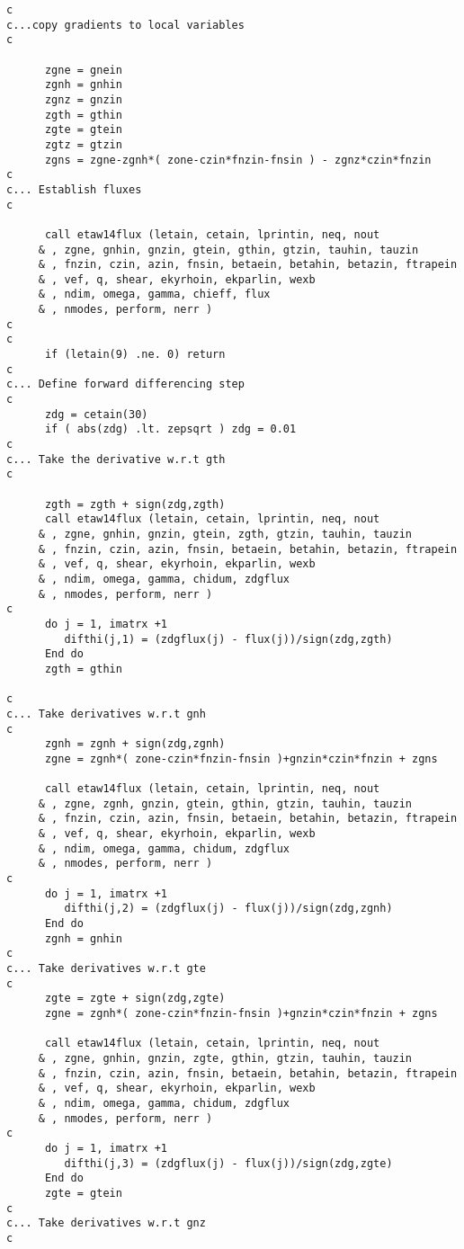 \begin{verbatim}
c
c...copy gradients to local variables
c

      zgne = gnein
      zgnh = gnhin
      zgnz = gnzin
      zgth = gthin
      zgte = gtein
      zgtz = gtzin
      zgns = zgne-zgnh*( zone-czin*fnzin-fnsin ) - zgnz*czin*fnzin
c
c... Establish fluxes
c

      call etaw14flux (letain, cetain, lprintin, neq, nout
     & , zgne, gnhin, gnzin, gtein, gthin, gtzin, tauhin, tauzin
     & , fnzin, czin, azin, fnsin, betaein, betahin, betazin, ftrapein
     & , vef, q, shear, ekyrhoin, ekparlin, wexb
     & , ndim, omega, gamma, chieff, flux
     & , nmodes, perform, nerr )
c
c
      if (letain(9) .ne. 0) return
c
c... Define forward differencing step
c
      zdg = cetain(30)
      if ( abs(zdg) .lt. zepsqrt ) zdg = 0.01
c
c... Take the derivative w.r.t gth
c

      zgth = zgth + sign(zdg,zgth)
      call etaw14flux (letain, cetain, lprintin, neq, nout
     & , zgne, gnhin, gnzin, gtein, zgth, gtzin, tauhin, tauzin
     & , fnzin, czin, azin, fnsin, betaein, betahin, betazin, ftrapein
     & , vef, q, shear, ekyrhoin, ekparlin, wexb
     & , ndim, omega, gamma, chidum, zdgflux
     & , nmodes, perform, nerr )
c
      do j = 1, imatrx +1 
         difthi(j,1) = (zdgflux(j) - flux(j))/sign(zdg,zgth)
      End do
      zgth = gthin

c
c... Take derivatives w.r.t gnh
c
      zgnh = zgnh + sign(zdg,zgnh)
      zgne = zgnh*( zone-czin*fnzin-fnsin )+gnzin*czin*fnzin + zgns

      call etaw14flux (letain, cetain, lprintin, neq, nout
     & , zgne, zgnh, gnzin, gtein, gthin, gtzin, tauhin, tauzin
     & , fnzin, czin, azin, fnsin, betaein, betahin, betazin, ftrapein
     & , vef, q, shear, ekyrhoin, ekparlin, wexb
     & , ndim, omega, gamma, chidum, zdgflux
     & , nmodes, perform, nerr )
c
      do j = 1, imatrx +1
         difthi(j,2) = (zdgflux(j) - flux(j))/sign(zdg,zgnh)
      End do
      zgnh = gnhin
c
c... Take derivatives w.r.t gte
c
      zgte = zgte + sign(zdg,zgte)
      zgne = zgnh*( zone-czin*fnzin-fnsin )+gnzin*czin*fnzin + zgns

      call etaw14flux (letain, cetain, lprintin, neq, nout
     & , zgne, gnhin, gnzin, zgte, gthin, gtzin, tauhin, tauzin
     & , fnzin, czin, azin, fnsin, betaein, betahin, betazin, ftrapein
     & , vef, q, shear, ekyrhoin, ekparlin, wexb
     & , ndim, omega, gamma, chidum, zdgflux
     & , nmodes, perform, nerr )
c
      do j = 1, imatrx +1
         difthi(j,3) = (zdgflux(j) - flux(j))/sign(zdg,zgte)
      End do
      zgte = gtein
c
c... Take derivatives w.r.t gnz
c


\end{verbatim}
